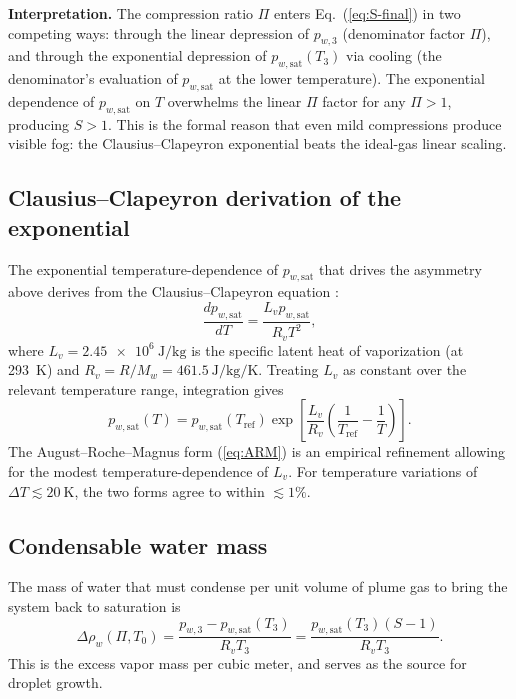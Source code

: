 \documentclass[11pt,a4paper]{article}
\newcommand{\pwsat}{p_{w,\text{sat}}}
\newcommand{\Tref}{T_{\text{ref}}}
\theoremstyle{definition}
\theoremstyle{plain}
\begin{document}
\noindent\textbf{Interpretation.} The compression ratio $\Pi$ enters Eq.~(\ref{eq:S-final}) in two competing ways: through the linear depression of $p_{w,3}$ (denominator factor $\Pi$), and through the exponential depression of $\pwsat(T_3)$ via cooling (the denominator's evaluation of $\pwsat$ at the lower temperature). The exponential dependence of $\pwsat$ on $T$ overwhelms the linear $\Pi$ factor for any $\Pi > 1$, producing $S > 1$. This is the formal reason that even mild compressions produce visible fog: the Clausius–Clapeyron exponential beats the ideal-gas linear scaling.

\subsection{Clausius–Clapeyron derivation of the exponential}

The exponential temperature-dependence of $\pwsat$ that drives the asymmetry above derives from the Clausius–Clapeyron equation \citep{Atkins2010}:
\begin{equation}
\frac{d\pwsat}{dT} = \frac{L_v \pwsat}{R_v T^2},
\end{equation}
where $L_v = \SI{2.45e6}{\joule\per\kilogram}$ is the specific latent heat of vaporization (at \SI{293}{\kelvin}) and $R_v = R/M_w = \SI{461.5}{\joule\per\kilogram\per\kelvin}$. Treating $L_v$ as constant over the relevant temperature range, integration gives
\begin{equation}
\label{eq:CC-integrated}
\pwsat(T) = \pwsat(\Tref)\exp\!\left[\frac{L_v}{R_v}\left(\frac{1}{\Tref} - \frac{1}{T}\right)\right].
\end{equation}
The August–Roche–Magnus form (\ref{eq:ARM}) is an empirical refinement allowing for the modest temperature-dependence of $L_v$. For temperature variations of $\Delta T \lesssim \SI{20}{\kelvin}$, the two forms agree to within $\lesssim 1\%$.

\subsection{Condensable water mass}

The mass of water that must condense per unit volume of plume gas to bring the system back to saturation is
\begin{equation}
\label{eq:dm}
\Delta\rho_w(\Pi, T_0) = \frac{p_{w,3} - \pwsat(T_3)}{R_v T_3} = \frac{\pwsat(T_3)(S-1)}{R_v T_3}.
\end{equation}
This is the excess vapor mass per cubic meter, and serves as the source for droplet growth.
\end{document}
